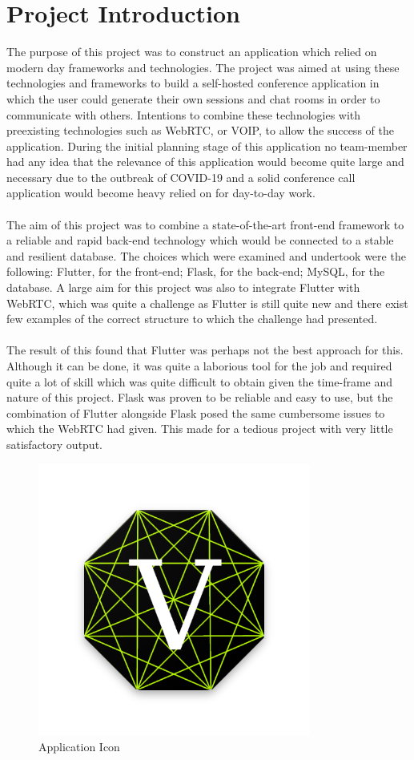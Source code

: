 \section{Project Introduction}
The purpose of this project was to construct an application which relied on modern day frameworks and technologies. The project was aimed at using these technologies and frameworks to build a self-hosted conference application in which the user could generate their own sessions and chat rooms in order to communicate with others. Intentions to combine these technologies with preexisting technologies such as WebRTC, or VOIP, to allow the success of the application. During the initial planning stage of this application no team-member had any idea that the relevance of this application would become quite large and necessary due to the outbreak of COVID-19 and a solid conference call application would become heavy relied on for day-to-day work.
\\\\ The aim of this project was to combine a state-of-the-art front-end framework to a reliable and rapid back-end technology which would be connected to a stable and resilient database. The choices which were examined and undertook were the following: Flutter, for the front-end; Flask, for the back-end; MySQL, for the database. A large aim for this project was also to integrate Flutter with WebRTC, which was quite a challenge as Flutter is still quite new and there exist few examples of the correct structure to which the challenge had presented.
\\\\ The result of this found that Flutter was perhaps not the best approach for this. Although it can be done, it was quite a laborious tool for the job and required quite a lot of skill which was quite difficult to obtain given the time-frame and nature of this project. Flask was proven to be reliable and easy to use, but the combination of Flutter alongside Flask posed the same cumbersome issues to which the WebRTC had given. This made for a tedious project with very little satisfactory output.
\begin{figure}[h!]
    \caption{Application Icon}
    \label{image:vertexChatLogo}
    \centering
    \includegraphics[width=0.8\textwidth]{images/vertexChatLogo.png}
\end{figure}